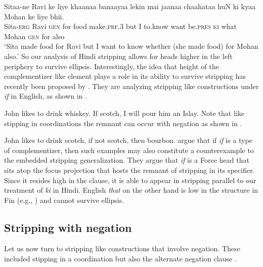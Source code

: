 \documentclass[output=paper]{langscibook}
\begin{document}
\ea \label{maex26}
    \gll Sitaa-ne Ravi ke liye khaanaa banaayaa lekin mai jaanaa chaahataa huN ki kyaa Mohan ke liye bhii.\\
    Sita-\textsc{erg} Ravi \textsc{gen} for food make.\textsc{prf.3} but I to.know want be.\textsc{pres} \textsc{ki} what Mohan \textsc{gen} for also\\
    \glt `Sita made food for Ravi but I want to know whether (she made food) for Mohan also.' 
\z 
So our analysis of Hindi stripping allows for heads higher in the left periphery to survive ellipsis. Interestingly, the idea that height of the complementizer like element plays a role in its ability to survive stripping has recently been proposed by \cite{yoshida18}. They are analyzing stripping like constructions under \emph{if} in English, as shown in .

\ea \label{maex27}
    John likes to drink whiskey. If scotch, I will pour him an Islay. \hfill \citep[1]{yoshida18}
\z 
Note that like stipping in coordinations the remnant can occur with negation as shown in .

\ea \label{maex28}
    John likes to drink scotch, if not scotch, then bourbon.
\z 
\cite{yoshida18} argue that if \emph{if} is a type of complementizer, then such examples may also constitute a counterexample to the embedded stripping generalization. They argue that \emph{if} is a Force head that sits atop the focus projection that hosts the remnant of stripping in its specifier. Since it resides high in the clause, it is able to appear in stripping parallel to our treatment of \emph{ki} in Hindi. English \emph{that} on the other hand is low in the structure in Fin (e.g., \citealt{baltin10}) and cannot survive ellipsis.



\subsection{Stripping with negation}
Let us now turn to stripping like constructions that involve negation. These included stipping in a coordination  but also the alternate negation clause .
\end{document}
